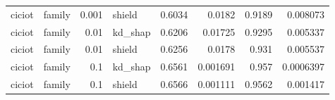 \begin{table}
\begin{tabular}{llrlrrrr}
ciciot & family & 0.001 & shield & 0.6034 & 0.0182 & 0.9189 & 0.008073 \\
ciciot & family & 0.01 & kd_shap & 0.6206 & 0.01725 & 0.9295 & 0.005337 \\
ciciot & family & 0.01 & shield & 0.6256 & 0.0178 & 0.931 & 0.005537 \\
ciciot & family & 0.1 & kd_shap & 0.6561 & 0.001691 & 0.957 & 0.0006397 \\
ciciot & family & 0.1 & shield & 0.6566 & 0.001111 & 0.9562 & 0.001417 \\
\bottomrule
\end{tabular}
\end{table}
